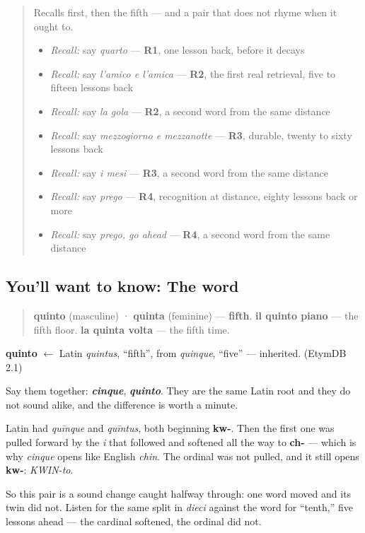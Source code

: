 \begin{quote}
Recalls first, then the fifth — and a pair that does not rhyme when it ought to.

\begin{itemize}
\raggedright
  \item \emph{Recall:} say \emph{quarto} — \textbf{R1}, one lesson back, before it decays
  \item \emph{Recall:} say \emph{l'amico e l'amica} — \textbf{R2}, the first real retrieval, five to fifteen lessons back
  \item \emph{Recall:} say \emph{la gola} — \textbf{R2}, a second word from the same distance
  \item \emph{Recall:} say \emph{mezzogiorno e mezzanotte} — \textbf{R3}, durable, twenty to sixty lessons back
  \item \emph{Recall:} say \emph{i mesi} — \textbf{R3}, a second word from the same distance
  \item \emph{Recall:} say \emph{prego} — \textbf{R4}, recognition at distance, eighty lessons back or more
  \item \emph{Recall:} say \emph{prego, go ahead} — \textbf{R4}, a second word from the same distance
\end{itemize}
\end{quote}

\subsection*{You'll want to know: The word}
\begin{quote}
\textbf{quinto} (masculine) · \textbf{quinta} (feminine) — \textbf{fifth}. \textbf{il quinto piano} — the fifth floor. \textbf{la quinta volta} — the fifth time.
\end{quote}

\begin{cousinweb}
\textbf{quinto} $\leftarrow$ Latin \emph{quintus}, \textquotedblleft{}fifth\textquotedblright{}, from \emph{quinque}, \textquotedblleft{}five\textquotedblright{} — inherited. (EtymDB 2.1)
\end{cousinweb}

\begin{sounds}
Say them together: \emph{\textbf{cinque}}, \emph{\textbf{quinto}}. They are the same Latin root and they do not sound alike, and the difference is worth a minute.

Latin had \emph{quīnque} and \emph{quīntus}, both beginning \textbf{kw-}. Then the first one was pulled forward by the \emph{i} that followed and softened all the way to \textbf{ch-} — which is why \emph{cinque} opens like English \emph{chin}. The ordinal was not pulled, and it still opens \textbf{kw-}: \emph{KWIN-to}.

So this pair is a sound change caught halfway through: one word moved and its twin did not. Listen for the same split in \emph{dieci} against the word for \textquotedblleft{}tenth,\textquotedblright{} five lessons ahead — the cardinal softened, the ordinal did not.
\end{sounds}

